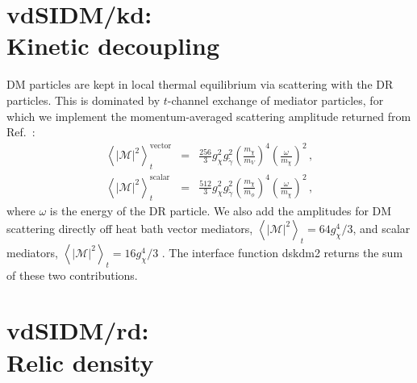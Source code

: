 \documentclass[a4paper,10pt,oneside]{book}
\newcommand{\bea}{\begin{eqnarray}}
\newcommand{\eea}{\end{eqnarray}}
\newcommand{\code}[1]{\ft{#1}}
\newcommand{\codeb}[1]{\ftb{#1}}
\newcommand{\ft}[1]{\textsf{#1}}
\newcommand{\ftb}[1]{{\bfseries \sffamily #1}}
\begin{document}
\section[vdSIDM/kd: Kinetic decoupling]{\codeb{vdSIDM/kd}:\\ Kinetic decoupling}
\label{sec:src_models/vdSIDM/kd}

\label{ch:vdSIDM_kd}

DM particles are kept in local thermal equilibrium via scattering with the 
DR particles. This is dominated by $t$-channel exchange of mediator particles, for which we implement
 the momentum-averaged scattering amplitude returned from Ref.~\cite{Bringmann:2016ilk}:
\bea
\left\langle \left| \mathcal{M}\right|^2 \right\rangle_t^\mathrm{vector} &=&
\frac{256}{3}g_\chi^2g_{\tilde \gamma}^2 \left(\frac{m_\chi}{m_V}\right)^4\left(\frac{\omega}{m_\chi}\right)^2\,,\\
\left\langle \left| \mathcal{M}\right|^2 \right\rangle_t^\mathrm{scalar} &=&
\frac{512}{3}g_\chi^2g_{\tilde \gamma}^2 \left(\frac{m_\chi}{m_\phi}\right)^4\left(\frac{\omega}{m_\chi}\right)^2\,,
\eea
where $\omega$ is the energy of the DR particle. We also add the amplitudes for DM scattering directly 
off heat bath vector mediators, $\left\langle \left| \mathcal{M}\right|^2 \right\rangle_t=64g_\chi^4/3$, and scalar mediators,   
$\left\langle \left| \mathcal{M}\right|^2 \right\rangle_t=16g_\chi^4/3$ \cite{Bringmann:2016ilk}.
The interface function \code{dskdm2} returns the sum of these two contributions.
\section[vdSIDM/rd: Relic density]{\codeb{vdSIDM/rd}:\\ Relic density}
\label{sec:src_models/vdSIDM/rd}

\label{ch:vdSIDM_rd}
\end{document}
